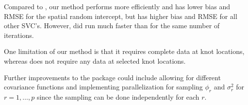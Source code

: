Compared to , our method performs more efficiently and has lower bias and RMSE for the spatial random intercept, but has higher bias and RMSE for all other SVC's. However,  did run much faster than  for the same number of iterations.

One limitation of our method is that it requires complete data at knot locations, whereas  does not require any data at selected knot locations.

Further improvements to the package could include allowing for different covariance functions and implementing parallelization for sampling $\phi_r$ and $\sigma_r^2$ for $r = 1, \dots, p$ since the sampling can be done independently for each $r$.

\newpage




 

